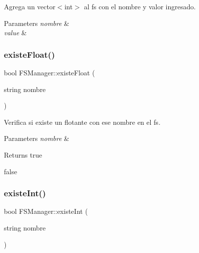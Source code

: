 Agrega un vector$<$int$>$ al fs con el nombre y valor ingresado. 


\begin{DoxyParams}{Parameters}
{\em nombre} & \\
\hline
{\em value} & \\
\hline
\end{DoxyParams}
\mbox{\label{classFSManager_a73be0c1d4d7aa7584f41c7bab0075bb2}} 
\subsubsection{\texorpdfstring{existe\+Float()}{existeFloat()}}
{\footnotesize\ttfamily bool F\+S\+Manager\+::existe\+Float (\begin{DoxyParamCaption}\item[{string}]{nombre }\end{DoxyParamCaption})\hspace{0.3cm}{\ttfamily [inline]}}



Verifica si existe un flotante con ese nombre en el fs. 


\begin{DoxyParams}{Parameters}
{\em nombre} & \\
\hline
\end{DoxyParams}
\begin{DoxyReturn}{Returns}
true 

false 
\end{DoxyReturn}
\mbox{\label{classFSManager_aae892b79cec4fc940972e9ab008e241e}} 
\subsubsection{\texorpdfstring{existe\+Int()}{existeInt()}}
{\footnotesize\ttfamily bool F\+S\+Manager\+::existe\+Int (\begin{DoxyParamCaption}\item[{string}]{nombre }\end{DoxyParamCaption})\hspace{0.3cm}{\ttfamily [inline]}}



